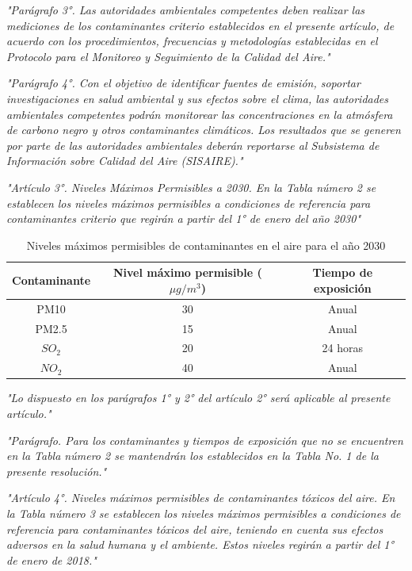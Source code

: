 \textit{"Parágrafo 3°. Las autoridades ambientales competentes deben realizar las mediciones de los contaminantes criterio establecidos en el presente artículo, de acuerdo con los procedimientos, frecuencias y metodologías establecidas en el Protocolo para el Monitoreo y Seguimiento de la Calidad del Aire."}

\textit{"Parágrafo 4°. Con el objetivo de identificar fuentes de emisión, soportar investigaciones en salud ambiental y sus efectos sobre el clima, las autoridades ambientales competentes podrán monitorear las concentraciones en la atmósfera de carbono negro y otros contaminantes climáticos. Los resultados que se generen por parte de las autoridades ambientales deberán reportarse al Subsistema de Información sobre Calidad del Aire (SISAIRE)."}

\textit{"Artículo 3°. Niveles Máximos Permisibles a 2030. En la Tabla número 2 se establecen los niveles máximos permisibles a condiciones de referencia para contaminantes criterio que regirán a partir del 1° de enero del año 2030"}

\begin{table}[h!]
	\begin{center}
		\begin{tabular}{| c | c | c |}
			\hline
			\rowcolor{lightgray}
			Contaminante 	& Nivel máximo permisible ($ \mu g/m^3 $) 	& Tiempo de exposición	\\ \hline
			PM10			& 30 		& Anual		\\ \hline
			PM2.5 			& 15 		& Anual 	\\ \hline
			$ SO_2 $		& 20 		& 24 horas 	\\ \hline
			$ NO_2 $		& 40 		& Anual 	\\ \hline
		\end{tabular}
		\caption{Niveles máximos permisibles de contaminantes en el aire para el año 2030}
	\end{center}
\end{table}


\textit{"Lo dispuesto en los parágrafos 1° y 2° del artículo 2° será aplicable al presente artículo."}

\textit{"Parágrafo. Para los contaminantes y tiempos de exposición que no se encuentren en la Tabla número 2 se mantendrán los establecidos en la Tabla No. 1 de la presente resolución."}

\textit{"Artículo 4°. Niveles máximos permisibles de contaminantes tóxicos del aire. En la Tabla número 3 se establecen los niveles máximos permisibles a condiciones de referencia para contaminantes tóxicos del aire, teniendo en cuenta sus efectos adversos en la salud humana y el ambiente. Estos niveles regirán a partir del 1° de enero de 2018."}

